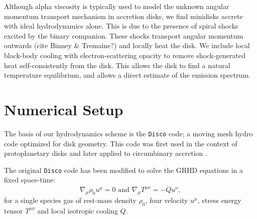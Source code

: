\documentclass{emulateapj}
\newcommand{\Disco}{{\texttt{Disco}}}
\begin{document}
Although alpha viscosity is typically used to model the unknown angular 
momentum transport mechanism in accretion disks, we find minidisks accrete with
ideal hydrodynamics alone.  This is due to the presence of spiral shocks excited by the binary companion. These shocks transport angular momentum outwards (cite Binney \& Tremaine?) and locally heat the disk. We include local 
black-body cooling with electron-scattering opacity to remove shock-generated
heat self-consistently from the disk.  This allows the disk to find a natural
temperature equilibrium, and allows a direct estimate of the emission spectrum.




\section{Numerical Setup}
\label{sec:numerics}

The basis of our hydrodynamics scheme is the \Disco{} code; a moving mesh hydro
code optimized for disk geometry. This code was first used in the context of
protoplanetary disks \citep{Duffell12, Duffell13, Duffell14} and later applied 
to circumbinary accretion \citep{Farris14, Farris15A, Farris15B}. 

The original \Disco{} code has been modified to solve the GRHD equations in a 
fixed space-time:
\begin{equation}
    \nabla_\mu \rho_0 u^\mu = 0 \text{ and } \nabla_\mu T^{\mu\nu} = -\dot{Q} u^\nu , \label{eq:GRHD}
\end{equation}
for a single species gas of rest-mass density $\rho_0$, four velocity $u^\mu$, 
stress energy tensor $T^{\mu\nu}$ and local isotropic cooling $\dot{Q}$.  
\end{document}
